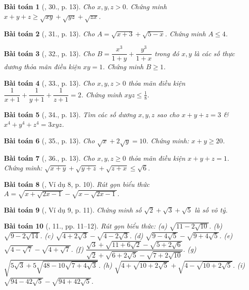 \documentclass{article}
\newtheorem{baitoan}{Bài toán}
\begin{document}
\begin{baitoan}[\cite{Tuyen_Toan_9}, 30., p. 13]
	Cho $x,y,z > 0$. Chứng minh $x + y + z\ge\sqrt{xy} + \sqrt{yz} + \sqrt{zx}$.
\end{baitoan}

\begin{baitoan}[\cite{Tuyen_Toan_9}, 31., p. 13]
	Cho $A = \sqrt{x + 3} + \sqrt{5 - x}$. Chứng minh $A\le4$.
\end{baitoan}

\begin{baitoan}[\cite{Tuyen_Toan_9}, 32., p. 13]
	Cho $B = \dfrac{x^3}{1 + y} + \dfrac{y^3}{1 + x}$ trong đó $x,y$ là các số thực dương thỏa mãn điều kiện $xy = 1$. Chứng minh $B\ge1$.
\end{baitoan}

\begin{baitoan}[\cite{Tuyen_Toan_9}, 33., p. 13]
	Cho $x,y,z > 0$ thỏa mãn điều kiện $\dfrac{1}{x + 1} + \dfrac{1}{y + 1} + \dfrac{1}{z + 1} = 2$. Chứng minh $xyz\le\frac{1}{8}$.
\end{baitoan}

\begin{baitoan}[\cite{Tuyen_Toan_9}, 34., p. 13]
	Tìm các số dương $x,y,z$ sao cho $x + y + z = 3$ \& $x^4 + y^4 + z^4 = 3xyz$.
\end{baitoan}

\begin{baitoan}[\cite{Tuyen_Toan_9}, 35., p. 13]
	Cho $\sqrt{x} + 2\sqrt{y} = 10$. Chứng minh: $x + y\ge20$.
\end{baitoan}

\begin{baitoan}[\cite{Tuyen_Toan_9}, 36., p. 13]
	Cho $x,y,z\ge0$ thỏa mãn điều kiện $x + y + z = 1$. Chứng minh: $\sqrt{x + y} + \sqrt{y + z} + \sqrt{z + x}\le\sqrt{6}$.
\end{baitoan}

\begin{baitoan}[\cite{Binh_Toan_9_tap_1}, Ví dụ 8, p. 10]
	Rút gọn biểu thức $A = \sqrt{x + \sqrt{2x - 1}} - \sqrt{ x - \sqrt{2x - 1}}$.
\end{baitoan}

\begin{baitoan}[\cite{Binh_Toan_9_tap_1}, Ví dụ 9, p. 11]
	Chứng minh số $\sqrt{2} + \sqrt{3} + \sqrt{5}$ là số vô tỷ.
\end{baitoan}

\begin{baitoan}[\cite{Binh_Toan_9_tap_1}, 11., pp. 11--12]
	Rút gọn biểu thức: (a) $\sqrt{11 - 2\sqrt{10}}$. (b) $\sqrt{9 - 2\sqrt{14}}$. (c) $\sqrt{4 + 2\sqrt{3}} - \sqrt{4 - 2\sqrt{3}}$. (d) $\sqrt{9 - 4\sqrt{5}} - \sqrt{9 + 4\sqrt{5}}$. (e) $\sqrt{4 - \sqrt{7}} - \sqrt{4 + \sqrt{7}}$. (f) $\dfrac{\sqrt{3} + \sqrt{11 + 6\sqrt{2}}- \sqrt{5 + 2\sqrt{6}}}{\sqrt{2} + \sqrt{6 + 2\sqrt{5}} - \sqrt{7 + 2\sqrt{10}}}$. (g) $\sqrt{5\sqrt{3} + 5\sqrt{48 - 10\sqrt{7+ 4\sqrt{3}}}}$. (h) $\sqrt{4 + \sqrt{10 + 2\sqrt{5}}} + \sqrt{4 - \sqrt{10 + 2\sqrt{5}}}$. (i) $\sqrt{94 - 42\sqrt{5}} - \sqrt{94 + 42\sqrt{5}}$.
\end{baitoan}
\end{document}
